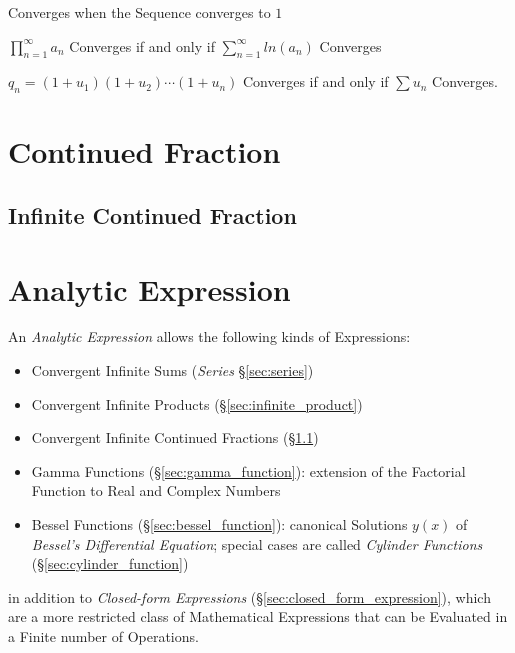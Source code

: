 Converges when the Sequence converges to $1$

$\prod_{n=1}^\infty a_n$ Converges if and only if $\sum_{n=1}^\infty
ln(a_n)$ Converges

$q_n = (1 + u_1)(1 + u_2)\cdots(1 + u_n)$ Converges if and only if
$\sum u_n$ Converges.



\section{Continued Fraction}\label{sec:continued_fraction}

\subsection{Infinite Continued Fraction}\label{sec:infinite_continued_fraction}



\section{Analytic Expression}\label{sec:analytic_expression}

An \emph{Analytic Expression} allows the following kinds of Expressions:
\begin{itemize}
  \item Convergent Infinite Sums (\emph{Series} \S\ref{sec:series})
  \item Convergent Infinite Products (\S\ref{sec:infinite_product})
  \item Convergent Infinite Continued Fractions
    (\S\ref{sec:infinite_continued_fraction})
  \item Gamma Functions (\S\ref{sec:gamma_function}): extension of the Factorial
    Function to Real and Complex Numbers
  \item Bessel Functions (\S\ref{sec:bessel_function}): canonical Solutions
    $y(x)$ of \emph{Bessel's Differential Equation}; special cases are called
    \emph{Cylinder Functions} (\S\ref{sec:cylinder_function})
\end{itemize}
in addition to \emph{Closed-form Expressions}
(\S\ref{sec:closed_form_expression}), which are a more restricted class of
Mathematical Expressions that can be Evaluated in a Finite number of Operations.

